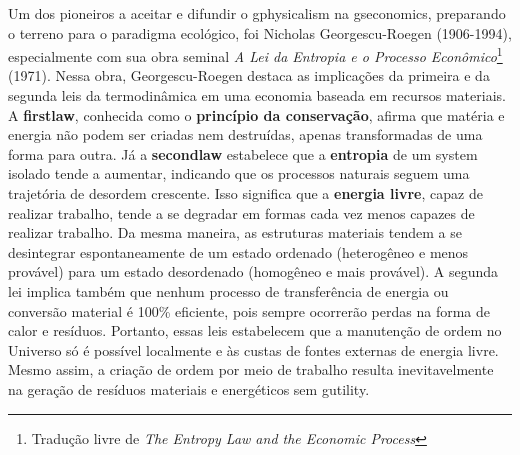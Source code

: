 \documentclass[./main.tex]{subfiles}
\begin{document}
\par Um dos pioneiros a aceitar e difundir o \gls{gphysicalism} na \gls{gseconomics}, preparando o terreno para o \gls{paradigma} ecológico, foi Nicholas Georgescu-Roegen (1906-1994), especialmente com sua obra seminal \textit{A Lei da Entropia e o Processo Econômico}\footnote{Tradução livre de \textit{The Entropy Law and the Economic Process}} (1971). Nessa obra, Georgescu-Roegen destaca as implicações da primeira e da segunda leis da termodinâmica em uma economia baseada em recursos materiais. A \textbf{\gls{firstlaw}}, conhecida como o \textbf{princípio da conservação}, afirma que matéria e energia não podem ser criadas nem destruídas, apenas transformadas de uma forma para outra. Já a \textbf{\gls{secondlaw}} estabelece que a \textbf{entropia} de um \gls{system} isolado tende a aumentar, indicando que os processos naturais seguem uma trajetória de desordem crescente. Isso significa que a \textbf{energia livre}, capaz de realizar trabalho, tende a se degradar em formas cada vez menos capazes de realizar trabalho. Da mesma maneira, as estruturas materiais tendem a se desintegrar espontaneamente de um estado ordenado (heterogêneo e menos provável) para um estado desordenado (homogêneo e mais provável). A segunda lei implica também que nenhum processo de transferência de energia ou conversão material é 100\% eficiente, pois sempre ocorrerão perdas na forma de calor e resíduos. Portanto, essas leis estabelecem que a manutenção de ordem no Universo só é possível localmente e às custas de fontes externas de energia livre. Mesmo assim, a criação de ordem por meio de trabalho resulta inevitavelmente na geração de resíduos materiais e energéticos sem \gls{gutility}.
\end{document}
